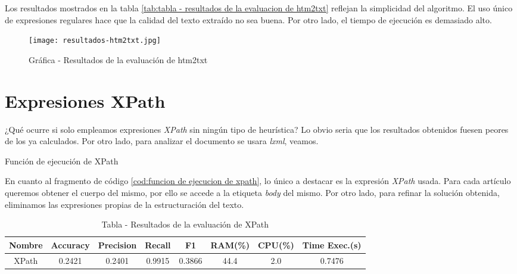 Los resultados mostrados en la tabla \ref{tab:tabla - resultados de la evaluacion de htm2txt} reflejan la
simplicidad del algoritmo. El uso único de expresiones regulares hace que la calidad del texto extraído
no sea buena. Por otro lado, el tiempo de ejecución es demasiado alto.

\begin{figure}[tphb]
    \centering
    \texttt{[image: resultados-htm2txt.jpg]}
    \caption{Gráfica - Resultados de la evaluación de htm2txt}
    \label{img:grafica - resultados de la evaluacion de htm2txt}
\end{figure}

\section*{Expresiones XPath}

¿Qué ocurre si solo empleamos expresiones \emph{XPath} sin ningún tipo de heurística? Lo obvio seria que
los resultados obtenidos fuesen peores de los ya calculados. Por otro lado, para analizar el documento se 
usara \emph{lxml}, veamos.

\begin{codefloat}
    
    \caption{Función de ejecución de XPath}
    \label{cod:funcion de ejecucion de xpath}
\end{codefloat}

En cuanto al fragmento de código \ref{cod:funcion de ejecucion de xpath}, lo único a destacar es la expresión
\emph{XPath} usada. Para cada artículo queremos obtener el cuerpo del mismo, por ello se accede a la 
etiqueta \emph{body} del mismo. Por otro lado, para refinar la solución obtenida, eliminamos las expresiones 
propias de la estructuración del texto.

\begin{table}[h]
    \begin{center}
      \begin{tabular}{| c | c | c | c | c | c | c | c |} \hline 
       \textbf{Nombre} & \textbf{Accuracy} & \textbf{Precision}  & \textbf{Recall} & \textbf{F1} & \textbf{RAM(\%)} & \textbf{CPU(\%)} & \textbf{Time Exec.(s)} \\ \hline
       XPath & 0.2421 & 0.2401 & 0.9915 & 0.3866 & 44.4 & 2.0 & 0.7476 \\ \hline
      \end{tabular}
      \caption{Tabla - Resultados de la evaluación de XPath}
      \label{tab:tabla - resultados de la evaluacion de xpath}
    \end{center}
\end{table}

